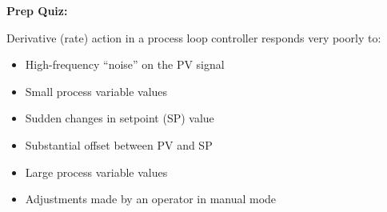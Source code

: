 \vfil \eject

\noindent
{\bf Prep Quiz:}

Derivative (rate) action in a process loop controller responds very poorly to:

\begin{itemize}
\item{} High-frequency ``noise'' on the PV signal
\vskip 5pt 
\item{} Small process variable values
\vskip 5pt 
\item{} Sudden changes in setpoint (SP) value
\vskip 5pt 
\item{} Substantial offset between PV and SP
\vskip 5pt 
\item{} Large process variable values 
\vskip 5pt 
\item{} Adjustments made by an operator in manual mode
\end{itemize}





